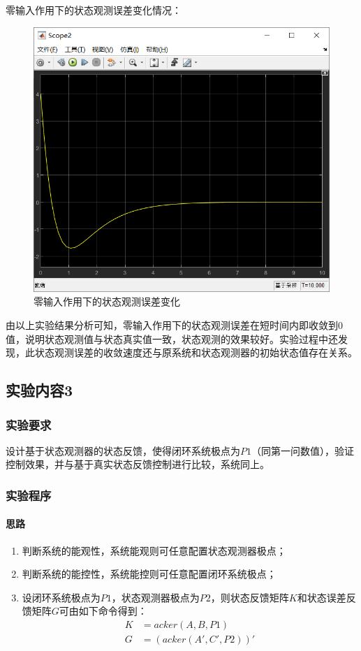 \documentclass[UTF8]{article}
\begin{document}
\noindent 零输入作用下的状态观测误差变化情况：
\begin{figure}[H]
    \centering %
    \includegraphics[width=.8\textwidth]{figure/exp3_2_零输入作用下的状态观测误差变化.png} 
    \caption{零输入作用下的状态观测误差变化} %
\end{figure}
由以上实验结果分析可知，零输入作用下的状态观测误差在短时间内即收敛到0值，说明状态观测值与状态真实值一致，状态观测的效果较好。实验过程中还发现，此状态观测误差的收敛速度还与原系统和状态观测器的初始状态值存在关系。

\subsection{实验内容3}
\subsubsection{实验要求}
设计基于状态观测器的状态反馈，使得闭环系统极点为$P1$（同第一问数值），验证控制效果，并与基于真实状态反馈控制进行比较，系统同上。

\subsubsection{实验程序}
\paragraph{思路}
\begin{enumerate}
    \item 判断系统的能观性，系统能观则可任意配置状态观测器极点；
    \item 判断系统的能控性，系统能控则可任意配置闭环系统极点；
    \item 设闭环系统极点为$P1$，状态观测器极点为$P2$，则状态反馈矩阵$K$和状态误差反馈矩阵$G$可由如下命令得到：
\begin{align*}
    K &= acker(A, B, P1) \\
    G &= (acker(A', C', P2))'
\end{align*}
\end{enumerate}
\end{document}
